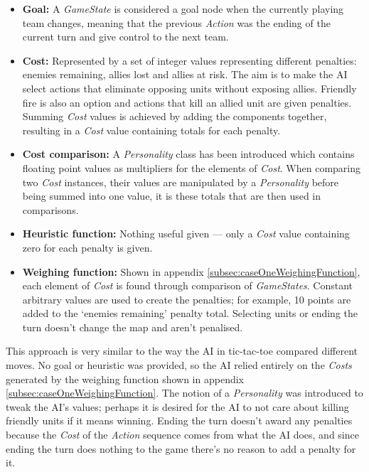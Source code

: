 \documentclass[11pt, a4paper]{report}
\begin{document}
\begin{itemize}
  \item \textbf{Goal:} A \emph{GameState} is considered a goal node when the currently playing team changes, meaning that the previous \emph{Action} was the ending of the current turn and give control to the next team.
  \item \textbf{Cost:} Represented by a set of integer values representing different penalties: enemies remaining, allies lost and allies at risk. The aim is to make the AI select actions that eliminate opposing units without exposing allies. Friendly fire is also an option and actions that kill an allied unit are given penalties. Summing \emph{Cost} values is achieved by adding the components together, resulting in a \emph{Cost} value containing totals for each penalty.
  \item \textbf{Cost comparison:} A \emph{Personality} class has been introduced which contains floating point values as multipliers for the elements of \emph{Cost}. When comparing two \emph{Cost} instances, their values are manipulated by a \emph{Personality} before being summed into one value, it is these totals that are then used in comparisons.
  \item \textbf{Heuristic function:} Nothing useful given --- only a \emph{Cost} value containing zero for each penalty is given.
  \item \textbf{Weighing function:} Shown in appendix \ref{subsec:caseOneWeighingFunction}, each element of \emph{Cost} is found through comparison of \emph{GameStates}. Constant arbitrary values are used to create the penalties; for example, 10 points are added to the `enemies remaining' penalty total. Selecting units or ending the turn doesn't change the map and aren't penalised.
\end{itemize}

This approach is very similar to the way the AI in tic-tac-toe compared different moves. No goal or heuristic was provided, so the AI relied entirely on the \emph{Costs} generated by the weighing function shown in appendix \ref{subsec:caseOneWeighingFunction}. The notion of a \emph{Personality} was introduced to tweak the AI's values; perhaps it is desired for the AI to not care about killing friendly units if it means winning. Ending the turn doesn't award any penalties because the \emph{Cost} of the \emph{Action} sequence comes from what the AI does, and since ending the turn does nothing to the game there's no reason to add a penalty for it.
\end{document}
